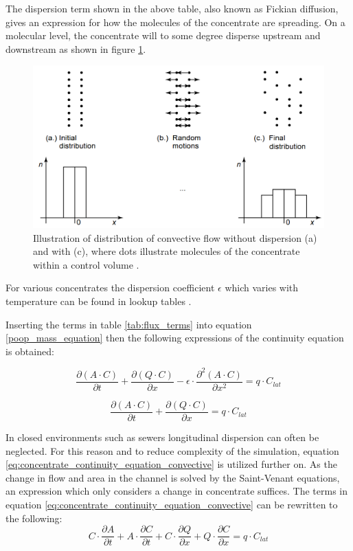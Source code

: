 The dispersion term shown in the above table, also known as Fickian diffusion, gives an expression for how the molecules of the concentrate are spreading. On a molecular level, the concentrate will to some degree disperse upstream and downstream as shown in figure \ref{fig:diffusion_example}. 

\begin{figure}[H]
\centering
\includegraphics[width=.75\textwidth]{report/modeling/pictures/diffusion_example.png}
\caption{Illustration of distribution of convective flow without dispersion (a) and with (c), where dots illustrate molecules of the concentrate within a control volume \cite{karlruhe_con_def_dif_equation}.}
\label{fig:diffusion_example}
\end{figure} 

For various concentrates the dispersion coefficient $\epsilon$ which varies with temperature can be found in lookup tables \cite{karlruhe_con_def_dif_equation}.

Inserting the terms in table \ref{tab:flux_terms} into equation \ref{poop_mass_equation} then the following expressions of the continuity equation is obtained:

\begin{equation}
	\frac{\partial (A\cdot C)}{\partial t} + \frac{\partial (Q \cdot C)}{\partial x} - \epsilon \cdot \frac{\partial^2 (A \cdot C)}{\partial x^2} = q \cdot C_{lat} 
\label{eq:concentrate_continuity_equation_dispersion}
\end{equation}

\begin{equation}
\frac{\partial (A\cdot C)}{\partial t} + \frac{\partial (Q \cdot C)}{\partial x} = q \cdot C_{lat} 
\label{eq:concentrate_continuity_equation_convective}
\end{equation}

In closed environments such as sewers longitudinal dispersion can often be neglected\cite{vestergaard1989numerical}. For this reason and to reduce complexity of the simulation, equation \ref{eq:concentrate_continuity_equation_convective} is utilized further on.
As the change in flow and area in the channel is solved by the Saint-Venant equations, an expression which only considers a change in concentrate suffices.
The terms in equation \ref{eq:concentrate_continuity_equation_convective} can be rewritten to the following:
\begin{equation}
	C \cdot \frac{\partial A}{\partial t} + A \cdot \frac{\partial C}{\partial t} + C \cdot \frac{\partial Q}{\partial x} + Q \cdot \frac{\partial C}{\partial x} = q \cdot C_{lat}
\label{eq:poop_trans_deriv1}
\end{equation}

